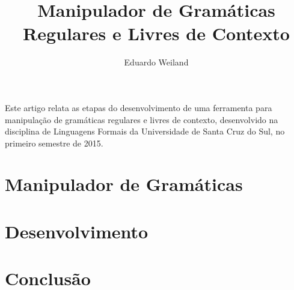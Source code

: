 \documentclass[12pt]{article}
\title{Manipulador de Gramáticas Regulares e Livres de Contexto}
\author{Eduardo Weiland\inst{1}}
\begin{document}
\maketitle

\begin{resumo}
  Este artigo relata as etapas do desenvolvimento de uma ferramenta para manipulação de gramáticas regulares e livres
  de contexto, desenvolvido na disciplina de Linguagens Formais da Universidade de Santa Cruz do Sul, no primeiro
  semestre de 2015.
\end{resumo}


\section{Manipulador de Gramáticas}


\section{Desenvolvimento}


\section{Conclusão}

\end{document}
